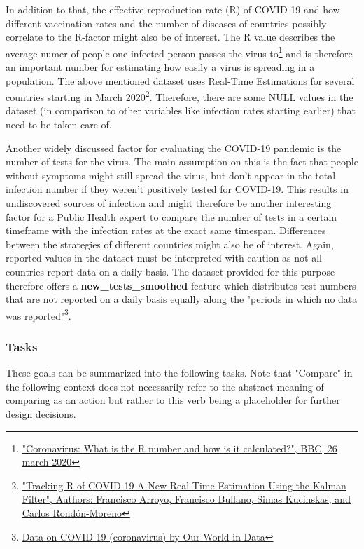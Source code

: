 \documentclass[11pt]{article}
\begin{document}
In addition to that, the effective reproduction rate (R) of COVID-19 and how different vaccination rates and the number of diseases of countries possibly 
correlate to the R-factor might also be of interest. The R value describes the average numer of people one infected person passes the virus 
to\footnote{\href{https://www.bbc.com/news/health-52473523}{"Coronavirus: What is the R number and how is it calculated?", BBC, 26 march 2020}} and is 
therefore an important number for estimating how easily a virus is spreading in a population. The above mentioned dataset uses Real-Time Estimations 
for several countries starting in 
March 2020\footnote{\href{https://github.com/crondonm/TrackingR/tree/main/Estimates-Database}{"Tracking R of COVID-19 A New Real-Time Estimation Using the Kalman Filter", Authors: Francisco Arroyo, Francisco Bullano, Simas Kucinskas, and Carlos Rondón-Moreno}}. Therefore, there are some NULL values in the dataset (in comparison to other 
variables like infection rates starting earlier) that need to be taken care of.

Another widely discussed factor for evaluating the COVID-19 pandemic is the number of tests for the virus. The main assumption on this is the fact that people 
without symptoms might still spread the virus, but don't appear in the total infection number if they weren't positively tested for COVID-19. This results in 
undiscovered sources of infection and might therefore be another interesting factor for a Public Health expert to compare the number of tests in a certain 
timeframe with the infection rates at the exact same timespan. Differences between the strategies of different countries might also be of interest. 
Again, reported values in the dataset must be interpreted with caution as not all countries report data on a daily basis. The dataset provided for this purpose therefore 
offers a \textbf{new\_tests\_smoothed} feature which distributes test numbers that are not reported on a daily basis equally along the "periods in which no data was 
reported"\footnote{\href{https://github.com/owid/covid-19-data/tree/master/public/data}{Data on COVID-19 (coronavirus) by Our World in Data}}.

\subsubsection{Tasks}
\label{sec:phtasks}
These goals can be summarized into the following tasks. Note that "Compare" in the following context does not necessarily refer to the abstract meaning 
of comparing as an action but rather to this verb being a placeholder for further design decisions.
\end{document}
